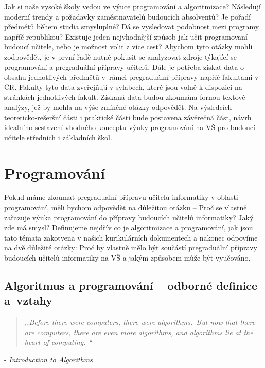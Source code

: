 \documentclass[FP,DP]{tulthesis}
\newcommand{\ahoj}[2]{\begin{quotation} \textit{#1} \end{quotation} \begin{flushright} - \textit{#2}\end{flushright} }
\begin{document}
Jak si naše vysoké školy vedou ve výuce programování a algoritmizace? Následují moderní trendy a požadavky zaměstnavatelů budoucích absolventů? Je pořadí předmětů během studia smysluplné? Dá se vysledovat podobnost mezi programy napříč republikou? Existuje  jeden nejvhodnější způsob jak učit programovaní budoucí učitele, nebo je možnost volit z více cest? Abychom tyto otázky mohli zodpovědět, je v první řadě nutné pokusit se analyzovat zdroje týkající se programování a pregraduální přípravy učitelů. Dále je potřeba získat data o obsahu jednotlivých předmětů v~rámci pregraduální přípravy napříč fakultami v ČR. Fakulty tyto data zveřejňují v sylabech, které jsou volně k dispozici na stránkách jednotlivých fakult. Získaná data budou zkoumána fornou textové analýzy, jež by mohla na výše zmíněné otázky odpovědět. Na výsledcích teoreticko-rešeršní části i praktické části bude postavena závěrečná část, návrh idealního sestavení vhodného konceptu výuky programování na VŠ pro budoucí učitele středních i základních škol.
\clearpage
\listoftodos
\chapter{Programování}
Pokud máme zkoumat pregradualní přípravu učitelů informatiky v oblasti programování, měli bychom odpovědět na důležitou otázku -- Proč se vlastně zařazuje výuka programování do přípravy budoucích učitelů informatiky? Jaký zde má smysl? Definujeme nejdřív co je algoritmizace a programování, jak jsou tato témata zakotvena v našich kurikulárních dokumentech a nakonec odpovíme na dvě důležité otázky: Proč by vlastně mělo být součástí pregraduální přípravy budoucích učitelů informatiky na VŠ a jakým způsobem může být vyučováno.
\section{Algoritmus a programování -- odborné definice a~vztahy}
\ahoj{,,Before there were computers, there were algorithms.~But now that there are computers,
there are even more algorithms, and algorithms lie at the heart of computing. ``}{Introduction to Algorithms}
\end{document}
